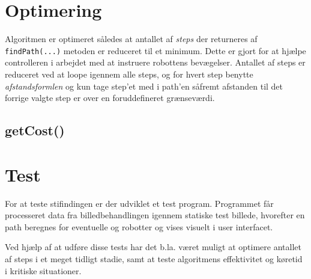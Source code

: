 \section{Optimering}
Algoritmen er optimeret således at antallet af \textit{steps} der returneres af \texttt{findPath(...)} metoden er reduceret til et minimum. Dette er gjort for at hjælpe controlleren i arbejdet med at instruere robottens bevægelser. Antallet af steps er reduceret ved at loope igennem alle steps, og for hvert step benytte \textit{afstandsformlen} og kun tage step'et med i path'en såfremt afstanden til det forrige valgte step er over en foruddefineret grænseværdi.
\subsection{getCost()}


\section{Test}
For at teste stifindingen er der udviklet et test program. Programmet får processeret data fra billedbehandlingen igennem statiske test billede, hvorefter en path beregnes for eventuelle og robotter og vises visuelt i user interfacet.

Ved hjælp af at udføre disse tests har det b.la. været muligt at optimere antallet af steps i et meget tidligt stadie, samt at teste algoritmens effektivitet og køretid i kritiske situationer.